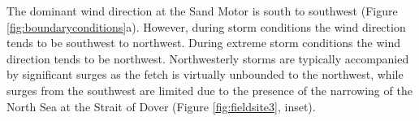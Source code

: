 

The dominant wind direction at the Sand Motor is south to southwest
(Figure \ref{fig:boundaryconditions}a). However, during storm
conditions the wind direction tends to be southwest to
northwest. During extreme storm conditions the wind direction tends to
be northwest. Northwesterly storms are typically accompanied by
significant surges as the fetch is virtually unbounded to the
northwest, while surges from the southwest are limited due to the
presence of the narrowing of the North Sea at the Strait of Dover
(Figure \ref{fig:fieldsite3}, inset).

